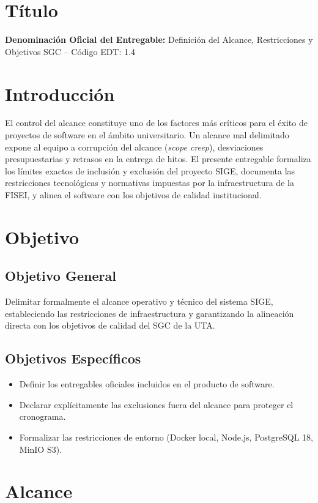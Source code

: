 \documentclass[12pt,a4paper]{article}
\begin{document}
\section{Título}
\textbf{Denominación Oficial del Entregable:} Definición del Alcance, Restricciones y Objetivos SGC -- Código EDT: 1.4

\section{Introducción}
El control del alcance constituye uno de los factores más críticos para el éxito de proyectos de software en el ámbito universitario. Un alcance mal delimitado expone al equipo a corrupción del alcance (\textit{scope creep}), desviaciones presupuestarias y retrasos en la entrega de hitos. El presente entregable formaliza los límites exactos de inclusión y exclusión del proyecto SIGE, documenta las restricciones tecnológicas y normativas impuestas por la infraestructura de la FISEI, y alinea el software con los objetivos de calidad institucional.

\section{Objetivo}
\subsection{Objetivo General}
Delimitar formalmente el alcance operativo y técnico del sistema SIGE, estableciendo las restricciones de infraestructura y garantizando la alineación directa con los objetivos de calidad del SGC de la UTA.
\subsection{Objetivos Específicos}
\begin{itemize}[leftmargin=1.5em, itemsep=2pt]
    \item Definir los entregables oficiales incluidos en el producto de software.
    \item Declarar explícitamente las exclusiones fuera del alcance para proteger el cronograma.
    \item Formalizar las restricciones de entorno (Docker local, Node.js, PostgreSQL 18, MinIO S3).
\end{itemize}

\section{Alcance}
\end{document}
